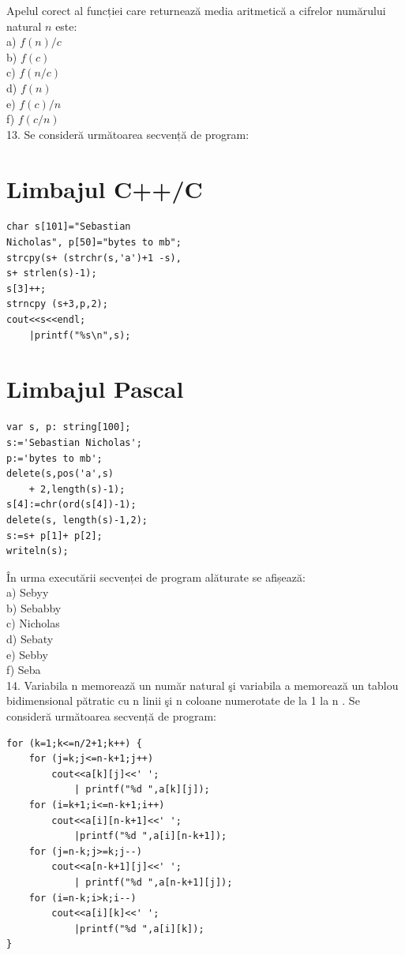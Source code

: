 \documentclass[10pt]{article}
\begin{document}
Apelul corect al funcției care returnează media aritmetică a cifrelor numărului natural $n$ este:\\
a) $f(n) / c$\\
b) $f(c)$\\
c) $f(n / c)$\\
d) $f(n)$\\
e) $f(c) / n$\\
f) $f(c / n)$\\
13. Se consideră următoarea secvență de program:

\section*{Limbajul C++/C}
\begin{verbatim}
char s[101]="Sebastian
Nicholas", p[50]="bytes to mb";
strcpy(s+ (strchr(s,'a')+1 -s),
s+ strlen(s)-1);
s[3]++;
strncpy (s+3,p,2);
cout<<s<<endl;
    |printf("%s\n",s);
\end{verbatim}

\section*{Limbajul Pascal}
\begin{verbatim}
var s, p: string[100];
s:='Sebastian Nicholas';
p:='bytes to mb';
delete(s,pos('a',s)
    + 2,length(s)-1);
s[4]:=chr(ord(s[4])-1);
delete(s, length(s)-1,2);
s:=s+ p[1]+ p[2];
writeln(s);
\end{verbatim}

În urma executării secvenței de program alăturate se afișează:\\
a) Sebyy\\
b) Sebabby\\
c) Nicholas\\
d) Sebaty\\
e) Sebby\\
f) Seba\\
14. Variabila n memorează un număr natural şi variabila a memorează un tablou bidimensional pătratic cu n linii şi n coloane numerotate de la 1 la n . Se consideră următoarea secvență de program:

\begin{verbatim}
for (k=1;k<=n/2+1;k++) {
    for (j=k;j<=n-k+1;j++)
        cout<<a[k][j]<<' ';
            | printf("%d ",a[k][j]);
    for (i=k+1;i<=n-k+1;i++)
        cout<<a[i][n-k+1]<<' ';
            |printf("%d ",a[i][n-k+1]);
    for (j=n-k;j>=k;j--)
        cout<<a[n-k+1][j]<<' ';
            | printf("%d ",a[n-k+1][j]);
    for (i=n-k;i>k;i--)
        cout<<a[i][k]<<' ';
            |printf("%d ",a[i][k]);
}
\end{verbatim}
\end{document}
